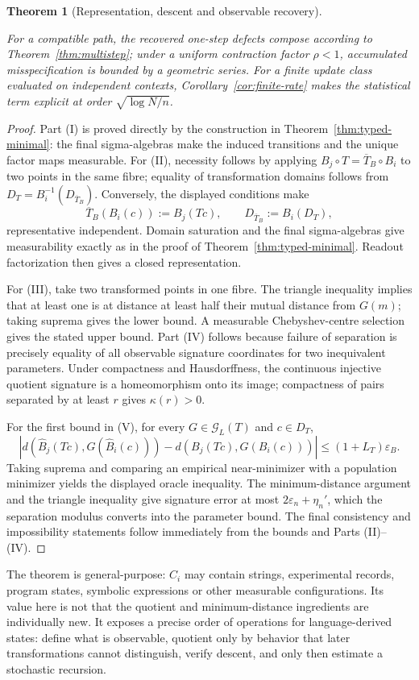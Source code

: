 \documentclass[11pt]{article}
\newtheorem{theorem}[definition]{Theorem}
\begin{document}
{\begin{theorem}[Representation, descent and observable recovery]
\begin{enumerate}
For a compatible path, the recovered one-step defects compose according to Theorem~\ref{thm:multistep}; under a uniform contraction factor $\rho<1$, accumulated misspecification is bounded by a geometric series. For a finite update class evaluated on independent contexts, Corollary~\ref{cor:finite-rate} makes the statistical term explicit at order $\sqrt{\log N/n}$.
\end{enumerate}
\end{theorem}

\begin{proof}
Part (I) is proved directly by the construction in Theorem~\ref{thm:typed-minimal}: the final sigma-algebras make the induced transitions and the unique factor maps measurable. For (II), necessity follows by applying $B_j\circ T=\overline T_B\circ B_i$ to two points in the same fibre; equality of transformation domains follows from $D_T=B_i^{-1}(D_{\overline T_B})$. Conversely, the displayed conditions make
\[
\overline T_B(B_i(c)):=B_j(Tc),\qquad
D_{\overline T_B}:=B_i(D_T),
\]
representative independent. Domain saturation and the final sigma-algebras give measurability exactly as in the proof of Theorem~\ref{thm:typed-minimal}. Readout factorization then gives a closed representation.

For (III), take two transformed points in one fibre. The triangle inequality implies that at least one is at distance at least half their mutual distance from $G(m)$; taking suprema gives the lower bound. A measurable Chebyshev-centre selection gives the stated upper bound. Part (IV) follows because failure of separation is precisely equality of all observable signature coordinates for two inequivalent parameters. Under compactness and Hausdorffness, the continuous injective quotient signature is a homeomorphism onto its image; compactness of pairs separated by at least $r$ gives $\kappa(r)>0$.

For the first bound in (V), for every $G\in\mathcal G_L(T)$ and $c\in D_T$,
\[
\left|
d(\widehat B_j(Tc),G(\widehat B_i(c)))
-d(B_j(Tc),G(B_i(c)))
\right|\le(1+L_T)\varepsilon_B.
\]
Taking suprema and comparing an empirical near-minimizer with a population minimizer yields the displayed oracle inequality. The minimum-distance argument and the triangle inequality give signature error at most $2\varepsilon_n+\eta_n'$, which the separation modulus converts into the parameter bound. The final consistency and impossibility statements follow immediately from the bounds and Parts (II)--(IV).
\end{proof}

The theorem is general-purpose: $C_i$ may contain strings, experimental
records, program states, symbolic expressions or other measurable
configurations.  Its value here is not that the quotient and
minimum-distance ingredients are individually new.  It exposes a precise
order of operations for language-derived states: define what is observable,
quotient only by behavior that later transformations cannot distinguish,
verify descent, and only then estimate a stochastic recursion.

}
\end{document}
